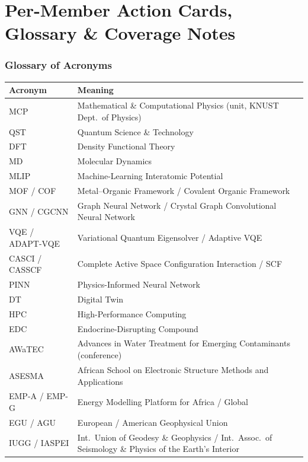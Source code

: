 \documentclass[11pt,a4paper]{article}
\begin{document}


\newpage
\part{Per-Member Action Cards, Glossary \& Coverage Notes}



\section{Glossary of Acronyms}

\begin{longtable}{@{}L{2.6cm}L{12.8cm}@{}}
\toprule
\textbf{Acronym} & \textbf{Meaning} \\
\midrule
\endhead
MCP & Mathematical \& Computational Physics (unit, KNUST Dept.\ of Physics) \\
QST & Quantum Science \& Technology \\
DFT & Density Functional Theory \\
MD & Molecular Dynamics \\
MLIP & Machine-Learning Interatomic Potential \\
MOF / COF & Metal--Organic Framework / Covalent Organic Framework \\
GNN / CGCNN & Graph Neural Network / Crystal Graph Convolutional Neural Network \\
VQE / ADAPT-VQE & Variational Quantum Eigensolver / Adaptive VQE \\
CASCI / CASSCF & Complete Active Space Configuration Interaction / SCF \\
PINN & Physics-Informed Neural Network \\
DT & Digital Twin \\
HPC & High-Performance Computing \\
EDC & Endocrine-Disrupting Compound \\
AWaTEC & Advances in Water Treatment for Emerging Contaminants (conference) \\
ASESMA & African School on Electronic Structure Methods and Applications \\
EMP-A / EMP-G & Energy Modelling Platform for Africa / Global \\
EGU / AGU & European / American Geophysical Union \\
IUGG / IASPEI & Int.\ Union of Geodesy \& Geophysics / Int.\ Assoc.\ of Seismology \& Physics of the Earth's Interior \\

\end{longtable}
\end{document}
